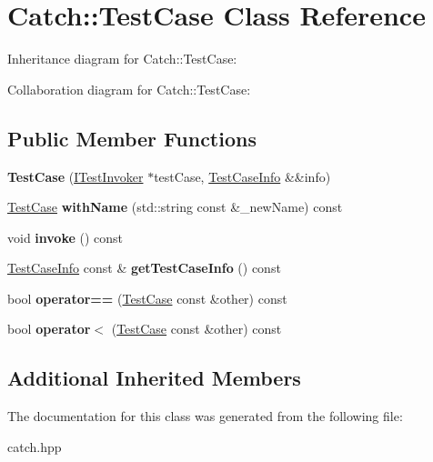 \hypertarget{classCatch_1_1TestCase}{}\section{Catch\+:\+:Test\+Case Class Reference}
\label{classCatch_1_1TestCase}


Inheritance diagram for Catch\+:\+:Test\+Case\+:


Collaboration diagram for Catch\+:\+:Test\+Case\+:
\subsection*{Public Member Functions}
\begin{DoxyCompactItemize}
\item 
\mbox{\label{classCatch_1_1TestCase_aae5709fc1cb68e19ab0ac27e1ffd6a76}} 
{\bfseries Test\+Case} (\hyperlink{structCatch_1_1ITestInvoker}{I\+Test\+Invoker} $\ast$test\+Case, \hyperlink{structCatch_1_1TestCaseInfo}{Test\+Case\+Info} \&\&info)
\item 
\mbox{\label{classCatch_1_1TestCase_a0812e8a216d09b087d5874687009f0d6}} 
\hyperlink{classCatch_1_1TestCase}{Test\+Case} {\bfseries with\+Name} (std\+::string const \&\+\_\+new\+Name) const
\item 
\mbox{\label{classCatch_1_1TestCase_a26f346c8446dded0562fe3818ae71651}} 
void {\bfseries invoke} () const
\item 
\mbox{\label{classCatch_1_1TestCase_a1ea0d79f49156cebea076fe1ba50d2b6}} 
\hyperlink{structCatch_1_1TestCaseInfo}{Test\+Case\+Info} const  \& {\bfseries get\+Test\+Case\+Info} () const
\item 
\mbox{\label{classCatch_1_1TestCase_a5456d03a90f75292835c158f3a3374a1}} 
bool {\bfseries operator==} (\hyperlink{classCatch_1_1TestCase}{Test\+Case} const \&other) const
\item 
\mbox{\label{classCatch_1_1TestCase_a030e4b9282e9b32e08c8bd5e5cd6fa98}} 
bool {\bfseries operator$<$} (\hyperlink{classCatch_1_1TestCase}{Test\+Case} const \&other) const
\end{DoxyCompactItemize}
\subsection*{Additional Inherited Members}


The documentation for this class was generated from the following file\+:\begin{DoxyCompactItemize}
\item 
catch.\+hpp\end{DoxyCompactItemize}
